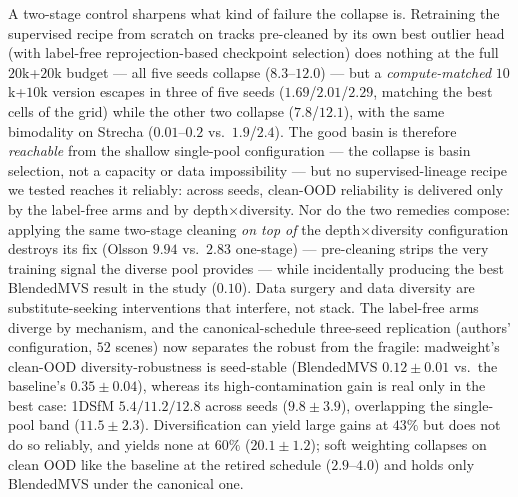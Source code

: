 \documentclass{article}
\newcommand{\mad}{madweight}
\begin{document}
A two-stage control sharpens what kind of failure the collapse is. Retraining the
supervised recipe from scratch on tracks pre-cleaned by its own best outlier head (with
label-free reprojection-based checkpoint selection) does nothing at the full $20$k+$20$k
budget --- all five seeds collapse ($8.3$--$12.0$) --- but a \emph{compute-matched}
$10$k+$10$k version escapes in three of five seeds ($1.69$/$2.01$/$2.29$, matching the
best cells of the grid) while the other two collapse ($7.8$/$12.1$), with the same
bimodality on Strecha ($0.01$--$0.2$ vs.\ $1.9$/$2.4$). The good basin is therefore
\emph{reachable} from the shallow single-pool configuration --- the collapse is basin
selection, not a capacity or data impossibility --- but no supervised-lineage recipe we
tested reaches it reliably: across seeds, clean-OOD reliability is delivered only by the
label-free arms and by depth$\times$diversity. Nor do the two remedies compose: applying
the same two-stage cleaning \emph{on top of} the depth$\times$diversity configuration
destroys its fix (Olsson $9.94$ vs.\ $2.83$ one-stage) --- pre-cleaning strips the very
training signal the diverse pool provides --- while incidentally producing the best
BlendedMVS result in the study ($0.10$). Data surgery and data diversity are
substitute-seeking interventions that interfere, not stack. The
label-free arms diverge by mechanism, and the canonical-schedule three-seed replication
(authors' configuration, $52$ scenes) now separates the robust from the fragile:
\mad{}'s clean-OOD diversity-robustness is seed-stable (BlendedMVS $0.12\pm0.01$ vs.\
the baseline's $0.35\pm0.04$), whereas its high-contamination gain is real only in the
best case: 1DSfM $5.4/11.2/12.8$ across seeds ($9.8\pm3.9$), overlapping the
single-pool band ($11.5\pm2.3$). Diversification can yield large gains at $43\%$ but
does not do so reliably, and yields none at $60\%$ ($20.1\pm1.2$); soft weighting
collapses on clean OOD like the baseline at the retired schedule ($2.9$--$4.0$) and
holds only BlendedMVS under the canonical one.
\end{document}
